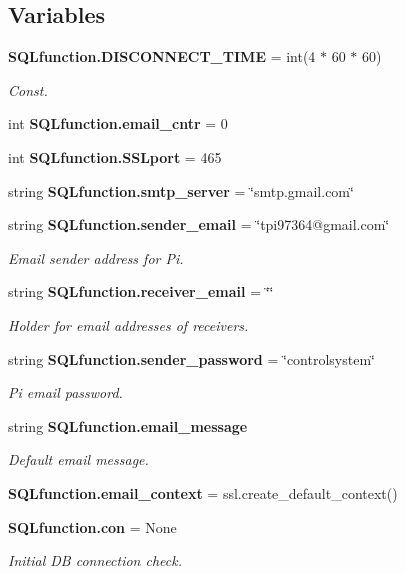\subsection*{Variables}
\begin{DoxyCompactItemize}
\item 
\textbf{ S\+Q\+Lfunction.\+D\+I\+S\+C\+O\+N\+N\+E\+C\+T\+\_\+\+T\+I\+ME} = int(4 $\ast$ 60 $\ast$ 60)
\begin{DoxyCompactList}\small\item\em Const. \end{DoxyCompactList}\item 
int \textbf{ S\+Q\+Lfunction.\+email\+\_\+cntr} = 0
\item 
int \textbf{ S\+Q\+Lfunction.\+S\+S\+Lport} = 465
\item 
string \textbf{ S\+Q\+Lfunction.\+smtp\+\_\+server} = \char`\"{}smtp.\+gmail.\+com\char`\"{}
\item 
string \textbf{ S\+Q\+Lfunction.\+sender\+\_\+email} = \char`\"{}tpi97364@gmail.\+com\char`\"{}
\begin{DoxyCompactList}\small\item\em Email sender address for Pi. \end{DoxyCompactList}\item 
string \textbf{ S\+Q\+Lfunction.\+receiver\+\_\+email} = \char`\"{}\char`\"{}
\begin{DoxyCompactList}\small\item\em Holder for email addresses of receivers. \end{DoxyCompactList}\item 
string \textbf{ S\+Q\+Lfunction.\+sender\+\_\+password} = \char`\"{}controlsystem\char`\"{}
\begin{DoxyCompactList}\small\item\em Pi email password. \end{DoxyCompactList}\item 
string \textbf{ S\+Q\+Lfunction.\+email\+\_\+message}
\begin{DoxyCompactList}\small\item\em Default email message. \end{DoxyCompactList}\item 
\textbf{ S\+Q\+Lfunction.\+email\+\_\+context} = ssl.\+create\+\_\+default\+\_\+context()
\item 
\textbf{ S\+Q\+Lfunction.\+con} = None
\begin{DoxyCompactList}\small\item\em Initial DB connection check. \end{DoxyCompactList}\item 

\end{DoxyCompactItemize}
